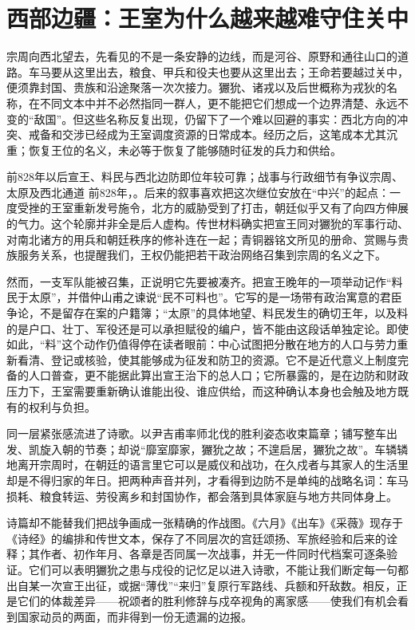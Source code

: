 \section{西部边疆：王室为什么越来越难守住关中}

宗周向西北望去，先看见的不是一条安静的边线，而是河谷、原野和通往山口的道路。车马要从这里出去，粮食、甲兵和役夫也要从这里出去；王命若要越过关中，便须靠封国、贵族和沿途聚落一次次接力。玁狁、诸戎以及后世概称为戎狄的名称，在不同文本中并不必然指同一群人，更不能把它们想成一个边界清楚、永远不变的“敌国”。但这些名称反复出现，仍留下了一个难以回避的事实：西北方向的冲突、戒备和交涉已经成为王室调度资源的日常成本。经历之后，这笔成本尤其沉重；恢复王位的名义，未必等于恢复了能够随时征发的兵力和供给。

\begin{event}{前828年以后}{宣王、料民与西北边防}{即位年较可靠；战事与行政细节有争议}{宗周、太原及西北通道}
前828年，。后来的叙事喜欢把这次继位安放在“中兴”的起点：一度受挫的王室重新发号施令，北方的威胁受到了打击，朝廷似乎又有了向四方伸展的气力。这个轮廓并非全是后人虚构。传世材料确实把宣王同对玁狁的军事行动、对南北诸方的用兵和朝廷秩序的修补连在一起；青铜器铭文所见的册命、赏赐与贵族服务关系，也提醒我们，王权仍能把若干政治网络召集到宗周的名义之下。

然而，一支军队能被召集，正说明它先要被凑齐。把宣王晚年的一项举动记作“料民于太原”，并借仲山甫之谏说“民不可料也”。它写的是一场带有政治寓意的君臣争论，不是留存在案的户籍簿；“太原”的具体地望、料民发生的确切王年，以及料的是户口、壮丁、军役还是可以承担赋役的编户，皆不能由这段话单独定论。即使如此，“料”这个动作仍值得停在读者眼前：中心试图把分散在地方的人口与劳力重新看清、登记或核验，使其能够成为征发和防卫的资源。它不是近代意义上制度完备的人口普查，更不能据此算出宣王治下的总人口；它所暴露的，是在边防和财政压力下，王室需要重新确认谁能出役、谁应供给，而这种确认本身也会触及地方既有的权利与负担。

同一层紧张感流进了诗歌。以尹吉甫率师北伐的胜利姿态收束篇章；铺写整车出发、凯旋入朝的节奏；却说“靡室靡家，玁狁之故；不遑启居，玁狁之故”。车辚辚地离开宗周时，在朝廷的语言里它可以是威仪和战功，在久戍者与其家人的生活里却是不得归家的年日。把两种声音并列，才看得到边防不是单纯的战略名词：车马损耗、粮食转运、劳役离乡和封国协作，都会落到具体家庭与地方共同体身上。

诗篇却不能替我们把战争画成一张精确的作战图。《六月》《出车》《采薇》现存于《诗经》的编排和传世文本，保存了不同层次的宫廷颂扬、军旅经验和后来的诠释；其作者、初作年月、各章是否同属一次战事，并无一件同时代档案可逐条验证。它们可以表明玁狁之患与戍役的记忆足以进入诗歌，不能让我们断定每一句都出自某一次宣王出征，或据“薄伐”“来归”复原行军路线、兵额和歼敌数。相反，正是它们的体裁差异——祝颂者的胜利修辞与戍卒视角的离家感——使我们有机会看到国家动员的两面，而非得到一份无遗漏的边报。


\end{event}
